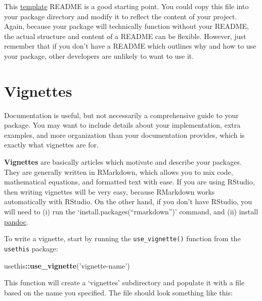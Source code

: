 \documentclass[]{book}
\newenvironment{Shaded}{\begin{snugshade}}{\end{snugshade}}
\newcommand{\KeywordTok}[1]{\textcolor[rgb]{0.13,0.29,0.53}{\textbf{#1}}}
\newcommand{\StringTok}[1]{\textcolor[rgb]{0.31,0.60,0.02}{#1}}
\newcommand{\OperatorTok}[1]{\textcolor[rgb]{0.81,0.36,0.00}{\textbf{#1}}}
\newcommand{\NormalTok}[1]{#1}
\begin{document}
This
\href{https://gist.github.com/PurpleBooth/109311bb0361f32d87a2}{template}
README is a good starting point. You could copy this file into your
package directory and modify it to reflect the content of your project.
Again, because your package will technically function without your
README, the actual structure and content of a README can be flexible.
However, just remember that if you don't have a README which outlines
why and how to use your package, other developers are unlikely to want
to use it.

\section{Vignettes}\label{vignettes}

Documentation is useful, but not necessarily a comprehensive guide to
your package. You may want to include details about your implementation,
extra examples, and more organization than your documentation provides,
which is exactly what vignettes are for.

\textbf{Vignettes} are basically articles which motivate and describe
your packages. They are generally written in RMarkdown, which allows you
to mix code, mathematical equations, and formatted text with ease. If
you are using RStudio, then writing vignettes will be very easy, because
RMarkdown works automatically with RStudio. On the other hand, if you
don't have RStudio, you will need to (i) run the
`install.packages(``rmarkdown'')' command, and (ii) install
\href{http://pandoc.org/installing.html}{pandoc}.

To write a vignette, start by running the \texttt{use\_vignette()}
function from the \texttt{usethis} package:

\begin{Shaded}
\begin{Highlighting}[]
\NormalTok{usethis}\OperatorTok{::}\KeywordTok{use_vignette}\NormalTok{(}\StringTok{'vignette-name'}\NormalTok{)}
\end{Highlighting}
\end{Shaded}

This function will create a `vignettes' subdirectory and populate it
with a file based on the name you specified. The file should look
something like this:
\end{document}
